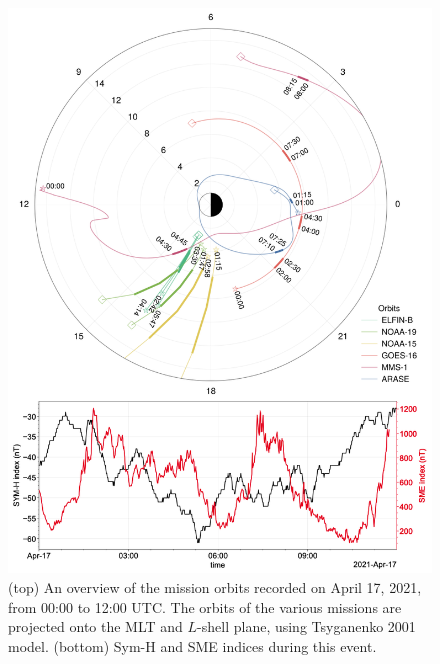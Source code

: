 \documentclass[
  letterpaper,
  DIV=11,
  numbers=noendperiod]{scrartcl}
\begin{document}
\begin{figure}[H]

{\centering \includegraphics{figures/fig1_orbit_multi_mission_conjunctions.png}

}

\caption{(top) An overview of the mission orbits recorded on April 17, 2021, from 00:00 to 12:00 UTC. The orbits of the various missions are projected onto the MLT and \(L\)-shell plane, using Tsyganenko 2001 model. (bottom) Sym-H and SME indices during this event.}

\end{figure}%


  



\end{document}
